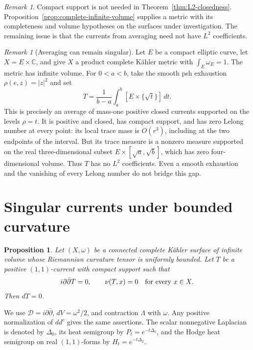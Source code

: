 \documentclass[11pt]{article}
\newtheorem{proposition}[theorem]{Proposition}
\theoremstyle{remark}
\newtheorem{remark}[theorem]{Remark}
\newcommand{\D}{\mathcal D}
\begin{document}
\begin{remark}
Compact support is not needed in Theorem~\ref{thm:L2-closedness}. Proposition~\ref{prop:complete-infinite-volume} supplies a metric with its completeness and volume hypotheses on the surfaces under investigation. The remaining issue is that the currents from averaging need not have $L^2$ coefficients.
\end{remark}

\begin{remark}[Averaging can remain singular]
Let $E$ be a compact elliptic curve, let $X=E\times\mathbb C$, and
give $X$ a product complete K\"ahler metric with
$\int_E\omega_E=1$. The metric has infinite volume. For
$0<a<b$, take the smooth psh exhaustion $\rho(e,z)=|z|^2$ and set
\[
 T=\frac1{b-a}\int_a^b [E\times\{\sqrt t\}]\,dt.
\]
This is precisely an average of mass-one positive closed currents
supported on the levels $\rho=t$. It is positive and closed, has
compact support, and has zero Lelong number at every point:
its local trace mass is $O(r^3)$, including at the two endpoints
of the interval. But its trace measure is a nonzero measure supported
on the real three-dimensional subset
$E\times[\sqrt a,\sqrt b]$, which has zero four-dimensional volume.
Thus $T$ has no $L^2$ coefficients. Even a smooth exhaustion and the
vanishing of every Lelong number do not bridge this gap.
\end{remark}






\section{Singular currents under bounded curvature}

\begin{proposition}\label{prop:bounded-geometry-closedness}
Let $(X,\omega)$ be a connected complete K\"ahler surface of infinite
volume whose Riemannian curvature tensor is uniformly bounded.
Let $T$ be a positive $(1,1)$-current with compact support
such that
\[
 i\partial\bar\partial T=0,
 \qquad \nu(T,x)=0\quad\hbox{for every }x\in X.
\]
Then $dT=0$.
\end{proposition}

We use $\D=i\partial\bar\partial$, $dV=\omega^2/2$, and contraction
$\Lambda$ with $\omega$. Any positive normalization of $dd^c$ gives
the same assertions. The scalar nonnegative Laplacian is denoted by
$\Delta_0$, its heat semigroup by $P_t=e^{-t\Delta_0}$, and the Hodge
heat semigroup on real $(1,1)$-forms by $H_t=e^{-t\Delta_2}$.
\end{document}
